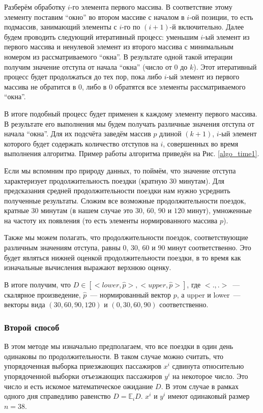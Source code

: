 \documentclass[12pt, fleqn, titlepage]{article}
\begin{document}
    Разберём обработку $i$-го элемента первого массива. В соответствие этому элементу поставим “окно” 
    во втором массиве с началом в $i$-ой позиции, то есть подмассив, занимающий элементы с $i$-го по $(i+1)$-й 
    включительно. Далее будем проводить следующий итеративный процесс: уменьшим $i$-ый элемент из первого 
    массива и ненулевой элемент из второго массива с минимальным номером из рассматриваемого “окна”. 
    В результате одной такой итерации получим значение отступа от начала “окна” (число от $0$ до $k$). 
    Этот итеративный процесс будет продолжаться до тех пор, пока либо $i$-ый элемент из первого массива 
    не обратится в $0$, либо в $0$ обратятся все элементы рассматриваемого “окна”.
    
    В итоге подобный процесс будет применен к каждому элементу первого массива. В результате его выполнения 
    мы будем получать различные значения отступа от начала “окна”. Для их подсчёта заведём массив $p$ длиной $(k+1)$, 
    $i$-ый элемент которого будет содержать количество отступов на $i$, совершенных во время выполнения алгоритма.
    Пример работы алгоритма приведён на Рис. \ref{algo_time1}.
    
    Если мы вспомним про природу данных, то поймём, что значение отступа характеризует продолжительность 
    поездки (кратную $30$ минутам). Для предсказания средней продолжительности поездки нам нужно усреднить полученные 
    результаты. Сложим все возможные продолжительности поездок, кратные $30$ минутам (в нашем случае это $30$, $60$, $90$ 
    и $120$ минут), умноженные на частоту их появления (то есть элементы нормированного массива $p$).
    
    Также мы можем полагать, что продолжительности поездок, соответствующие различным значениям отступа, равны $0$, 
    $30$, $60$ и $90$ минут соответственно. Это будет являться нижней оценкой продолжительности поездки, в то время как 
    изначальные вычисления выражают верхнюю оценку.

    В итоге получим, что $D \in [<lower, \hat{p}>, <upper, \hat{p}>]$, где $<.,.>$~--- скалярное произведение, $\hat{p}$~--- 
    нормированный вектор $p$, а upper и lower~--- векторы вида $(30, 60, 90, 120)$ и $(0, 30, 60, 90)$ соответственно.

    \subsubsection{Второй способ}

    В этом методе мы изначально предполагаем, что все поездки в один день одинаковы по продолжительности. 
    В таком случае можно считать, что упорядоченная выборка приезжающих пассажиров $x^i$ сдвинута относительно 
    упорядоченной выборки отъезжающих пассажиров $y^i$ на некоторое число. Это число и есть искомое математическое ожидание
    $D$. В этом случае в рамках одного дня справедливо равенство $D = \mathbb{E}_i D$. $x^i$ и $y^i$ имеют одинаковый 
    размер $n=38$.
    
\end{document}
